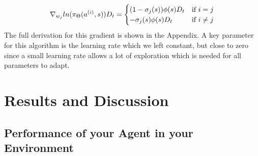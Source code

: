 \documentclass[journal, a4paper]{IEEEtran}
\theoremstyle{plain}
\theoremstyle{definition}
\begin{document}
\begin{equation}
\notag
\nabla_{w_j} ln(\pi_\Theta(a^{(i)},s))D_t=
	\begin{cases}
     (1-\sigma_j(s)) \phi(s)D_t  & \text{if $i = j$} \\
     -\sigma_j(s)\phi(s)  D_t & \text{if $i \neq  j$} \\ 
    \end{cases}
\end{equation}
The full derivation for this gradient is shown in the Appendix.\newline
A key parameter for this algorithm is the learning rate which we left constant, but close to zero since a small learning rate allows a lot of exploration which is needed for all parameters to adapt. 



\section{Results and Discussion}




\subsection{Performance of your Agent in your Environment}

\end{document}
